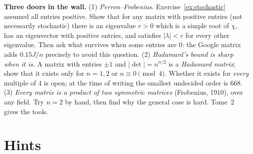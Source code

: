 \begin{challenge}
\textbf{Three doors in the wall.} (1) \emph{Perron--Frobenius.} Exercise~\ref{ex:stochastic} assumed all entries positive. Show that for any matrix with positive entries (not necessarily stochastic) there is an eigenvalue $r>0$ which is a simple root of $\chi$, has an eigenvector with positive entries, and satisfies $|\lambda|<r$ for every other eigenvalue. Then ask what survives when some entries are $0$: the Google matrix adds $0.15J/n$ precisely to avoid this question.
(2) \emph{Hadamard's bound is sharp when it is.} A matrix with entries $\pm1$ and $|\det|=n^{n/2}$ is a \emph{Hadamard matrix}; show that it exists only for $n=1,2$ or $n\equiv0\pmod 4$. Whether it exists for \emph{every} multiple of $4$ is open; at the time of writing the smallest undecided order is $668$.
(3) \emph{Every matrix is a product of two symmetric matrices} (Frobenius, 1910), over any field. Try $n=2$ by hand, then find why the general case is hard. Tome~2 gives the tools.
\end{challenge}

\section{Hints}

